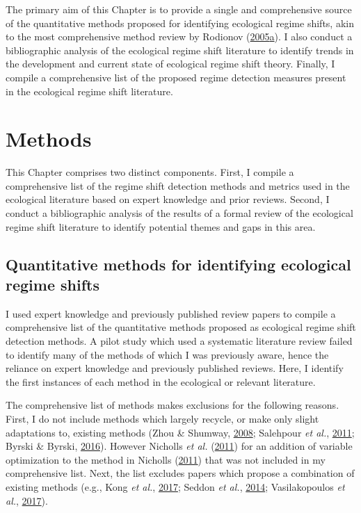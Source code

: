 \documentclass[12pt,twoside,openany]{reedthesis}
\begin{document}
The primary aim of this Chapter is to provide a single and comprehensive source of the quantitative methods proposed for identifying ecological regime shifts, akin to the most comprehensive method review by Rodionov (\protect\hyperlink{ref-rodionov_brief_2005}{2005}\protect\hyperlink{ref-rodionov_brief_2005}{a}). I also conduct a bibliographic analysis of the ecological regime shift literature to identify trends in the development and current state of ecological regime shift theory. Finally, I compile a comprehensive list of the proposed regime detection measures present in the ecological regime shift literature.

\hypertarget{methods}{%
\section{Methods}\label{methods}}

This Chapter comprises two distinct components. First, I compile a comprehensive list of the regime shift detection methods and metrics used in the ecological literature based on expert knowledge and prior reviews. Second, I conduct a bibliographic analysis of the results of a formal review of the ecological regime shift literature to identify potential themes and gaps in this area.

\hypertarget{revMeth1}{%
\subsection{Quantitative methods for identifying ecological regime shifts}\label{revMeth1}}

I used expert knowledge and previously published review papers to compile a comprehensive list of the quantitative methods proposed as ecological regime shift detection methods. A pilot study which used a systematic literature review failed to identify many of the methods of which I was previously aware, hence the reliance on expert knowledge and previously published reviews. Here, I identify the first instances of each method in the ecological or relevant literature.

The comprehensive list of methods makes exclusions for the following reasons. First, I do not include methods which largely recycle, or make only slight adaptations to, existing methods (Zhou \& Shumway, \protect\hyperlink{ref-zhou2008one}{2008}; Salehpour \emph{et al.}, \protect\hyperlink{ref-salehpour2011line}{2011}; Byrski \& Byrski, \protect\hyperlink{ref-byrski2016double}{2016}). However Nicholls \emph{et al.} (\protect\hyperlink{ref-nicholls2011biological}{2011}) for an addition of variable optimization to the method in Nicholls (\protect\hyperlink{ref-nicholls_detection_2011}{2011}) that was not included in my comprehensive list. Next, the list excludes papers which propose a combination of existing methods (e.g., Kong \emph{et al.}, \protect\hyperlink{ref-kong2017hydrological}{2017}; Seddon \emph{et al.}, \protect\hyperlink{ref-seddon2014quantitative}{2014}; Vasilakopoulos \emph{et al.}, \protect\hyperlink{ref-vasilakopoulos2017resilience}{2017}).
\end{document}
